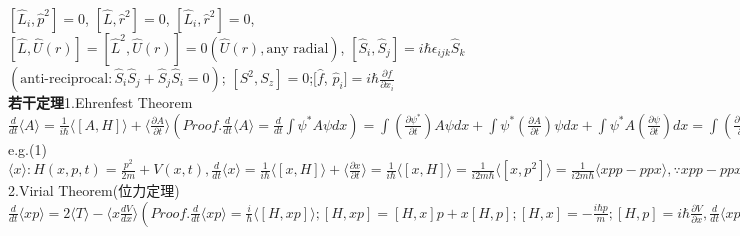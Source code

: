 \documentclass[UTF8,a4paper,7pt,twocolumn]{ctexart}
\begin{document}
    $[\hat{L}_{i},\hat{p}^{2}]=0$,
    $[\hat{L},\hat{r}^{2}]=0$,
    $[\hat{L}_{i},\hat{r}^{2}]=0$,
    $[\hat{L},\hat{U}(r)]=[\hat{L}^{2},\hat{U}(r)]=0(\hat{U}(r),\text{any radial})$,
    $[\hat{S}_{i},\hat{S}_{j}]=i\hbar\epsilon_{ijk}\hat{S}_{k}$
    $(\text{anti-reciprocal}:\hat{S}_{i}\hat{S}_{j}+\hat{S}_{j}\hat{S}_{i}=0)$;
    $[S^{2},S_{z}]=0$;$[\hat{f}$,
    $\hat{p}_{i}]=i\hbar\frac{\partial f}{\partial x_{i}}$\\
      \textbf{若干定理}1.Ehrenfest Theorem$\frac{d}{dt}\langle A\rangle=\frac{1}{i\hbar}\langle[A,H]\rangle+\langle\frac{\partial A}{\partial t}\rangle(Proof.\frac{d}{dt}\langle A \rangle=\frac{d}{dt}\int\psi^{*}A\psi dx)=\int(\frac{\partial \psi^{*}}{\partial t})A\psi dx+\int\psi^{*}(\frac{\partial A}{\partial t})\psi dx+\int\psi^{*}A(\frac{\partial \psi}{\partial t})dx=\int(\frac{\partial \psi^{*}}{\partial t})A\psi dx+\langle\frac{\partial A}{\partial t}\rangle+\int\psi^{*}A(\frac{\partial \psi}{\partial t})dx,\because H\psi=i\hbar\frac{\partial\psi}{\partial t},(H\psi)^{*}=-i\hbar\frac{\partial\psi^{*}}{\partial t},(H\psi)^{*}=\psi^{*}H^{*}=\psi^{*}H,\therefore =\frac{1}{i\hbar}\int\psi^{*}(AH-HA)\psi dx+\langle\frac{\partial A}{\partial t}\rangle=\frac{1}{i\hbar}\langle[A,H]\rangle+\langle\frac{\partial A}{\partial t}\rangle$e.g.(1)$\langle x\rangle:H(x,p,t)=\frac{p^2}{2m}+V(x,t),\frac{d}{dt}\langle x\rangle=\frac{1}{i\hbar}\langle[x,H]\rangle+\langle\frac{\partial x}{\partial t}\rangle=\frac{1}{i\hbar}\langle[x,H]\rangle=\frac{1}{i2m\hbar}\langle[x,p^2]\rangle=\frac{1}{i2m\hbar}\langle xpp-ppx\rangle,\because xpp-ppx=i2\hbar p,\therefore \frac{d}{dt}\langle x\rangle=\frac{1}{m}\langle p\rangle=\langle v\rangle;(2)\langle p\rangle:\frac{d}{dt}\langle p\rangle=\frac{1}{i\hbar}\langle[p,H]\rangle+\langle\frac{\partial p}{\partial t}\rangle,\because p=\frac{\hbar}{i}\frac{\partial}{\partial x}\longrightarrow[p,p^2]=0,\therefore \frac{d}{dt}\langle p\rangle=\frac{1}{i\hbar}\langle[p,V]\rangle=\int\psi^{*}V\frac{\partial}{\partial x}\psi dx-\int\psi^{*}\frac{\partial}{\partial x}(V\psi)dx=\langle-\frac{\partial}{\partial x}V\rangle;$2.Virial Theorem(位力定理)$\frac{d}{dt}\langle xp\rangle=2\langle T\rangle-\langle x\frac{dV}{dx}\rangle(Proof.\frac{d}{dt}\langle xp\rangle=\frac{i}{\hbar}\langle[H,xp]\rangle;[H,xp]=[H,x]p+x[H,p];[H,x]=-\frac{i\hbar p}{m};[H,p]=i\hbar\frac{\partial V}{\partial x},\frac{d}{dt}\langle xp\rangle=\frac{i}{\hbar}[-\frac{i\hbar}{m}\langle p^2\rangle+i\hbar\langle x\frac{\partial V}{\partial x}\rangle]=2\langle\frac{p^2}{2m}\rangle-\langle x\frac{\partial V}{\partial x}\rangle=2\langle T\rangle-\langle x\frac{\partial V}{\partial x}\rangle)$ \\
\end{document}
